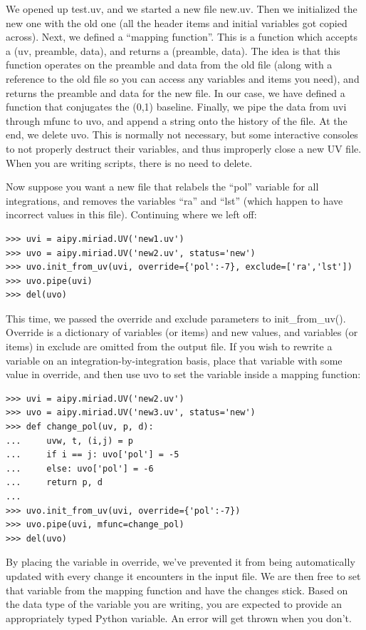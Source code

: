 We opened up test.uv, and we started a new file new.uv.  Then we initialized
the new one with the old one (all the header items and initial variables got
copied across).  Next, we defined a ``mapping function''.  This is a function
which accepts a (uv, preamble, data), and returns a (preamble, data).  The
idea is that this function operates on the preamble and data from the old
file (along with a reference to the old file so you can access any variables
and items you need), and returns the preamble and data for the new file.  In
our case, we have defined a function that conjugates the (0,1) baseline.
Finally, we pipe the data from uvi through mfunc to uvo, and append a string
onto the history of the file.  At the end, we delete uvo.  This is normally
not necessary, but some interactive consoles to not properly destruct their
variables, and thus improperly close a new UV file.  When you are writing
scripts, there is no need to delete.

Now suppose you want a new file that relabels the ``pol'' variable for all
integrations, and removes the variables ``ra'' and ``lst'' (which happen to
have incorrect values in this file).  Continuing where we left off:

\begin{verbatim}
>>> uvi = aipy.miriad.UV('new1.uv')
>>> uvo = aipy.miriad.UV('new2.uv', status='new')
>>> uvo.init_from_uv(uvi, override={'pol':-7}, exclude=['ra','lst'])
>>> uvo.pipe(uvi)
>>> del(uvo)
\end{verbatim}

This time, we passed the override and exclude parameters to init\_from\_uv().
Override is a dictionary of variables (or items) and new values, and
variables (or items) in exclude are omitted from the output file.  If you wish
to rewrite a variable on an integration-by-integration basis, place
that variable with some value in override, and then use uvo to set the variable
inside a mapping function:

\begin{verbatim}
>>> uvi = aipy.miriad.UV('new2.uv')
>>> uvo = aipy.miriad.UV('new3.uv', status='new')
>>> def change_pol(uv, p, d):
...     uvw, t, (i,j) = p
...     if i == j: uvo['pol'] = -5
...     else: uvo['pol'] = -6
...     return p, d
... 
>>> uvo.init_from_uv(uvi, override={'pol':-7})
>>> uvo.pipe(uvi, mfunc=change_pol)
>>> del(uvo)
\end{verbatim}

By placing the variable in override, we've prevented it from being
automatically updated with every change it encounters in the input file.
We are then free to set that variable from the mapping function and have the
changes stick.  Based on the data type of the variable you are writing,
you are expected to provide an appropriately typed Python variable.  An
error will get thrown when you don't.

